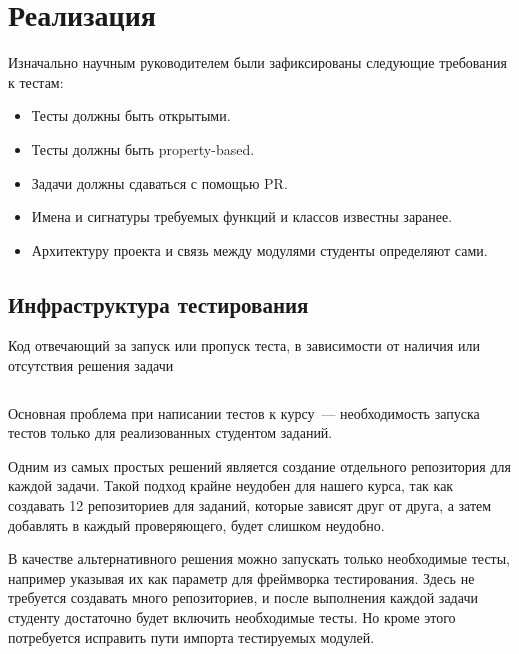 
\section{Реализация}

Изначально научным руководителем были зафиксированы следующие требования к тестам:
\begin{itemize}
    \item Тесты должны быть открытыми.
    \item Тесты должны быть property-based.
    \item Задачи должны сдаваться с помощью PR.
    \item Имена и сигнатуры требуемых функций и классов известны заранее.
    \item Архитектуру проекта и связь между модулями студенты определяют сами.
\end{itemize}

\subsection{Инфраструктура тестирования}
\label{subsec:infra}


\begin{listing}[b]
    \caption{Код отвечающий за запуск или пропуск теста, в зависимости от наличия или отсутствия решения задачи}
    \inputminted[linenos, breaklines, frame=single, fontsize = \small]{python3}{figures/minimal_example.py}
    \label{listing:skip}
\end{listing}

Основная проблема при написании тестов к курсу~--- необходимость запуска тестов только для реализованных студентом заданий.

Одним из самых простых решений является создание отдельного репозитория для каждой задачи.
Такой подход крайне неудобен для нашего курса, так как создавать 12 репозиториев для заданий, которые зависят друг от друга, а затем добавлять в каждый проверяющего, будет слишком неудобно.

В качестве альтернативного решения можно запускать только необходимые тесты, например указывая их как параметр для фреймворка тестирования.
Здесь не требуется создавать много репозиториев, и после выполнения каждой задачи студенту достаточно будет включить необходимые тесты.
Но кроме этого потребуется исправить пути импорта тестируемых модулей.

